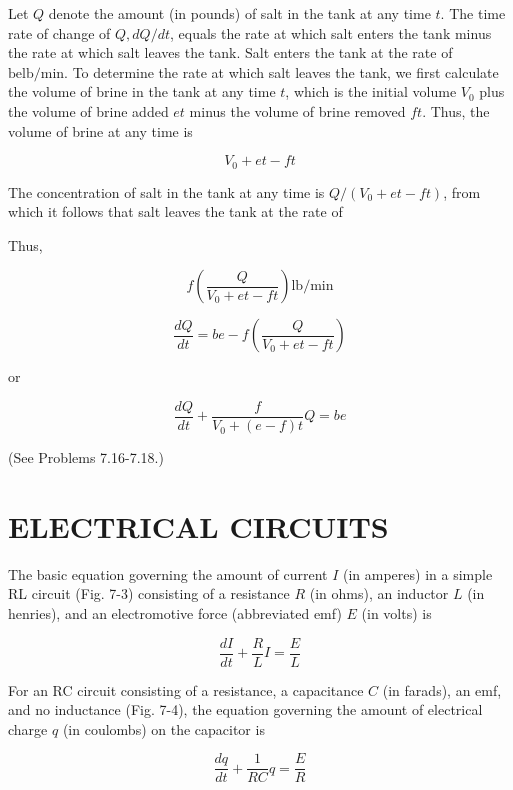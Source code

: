 \documentclass[10pt]{article}
\begin{document}
Let $Q$ denote the amount (in pounds) of salt in the tank at any time $t$. The time rate of change of $Q, d Q / d t$, equals the rate at which salt enters the tank minus the rate at which salt leaves the tank. Salt enters the tank at the rate of $\mathrm{be} \mathrm{lb} / \mathrm{min}$. To determine the rate at which salt leaves the tank, we first calculate the volume of brine in the tank at any time $t$, which is the initial volume $V_{0}$ plus the volume of brine added $e t$ minus the volume of brine removed $f t$. Thus, the volume of brine at any time is


\begin{equation*}
V_{0}+e t-f t \tag{7.7}
\end{equation*}


The concentration of salt in the tank at any time is $Q /\left(V_{0}+e t-f t\right)$, from which it follows that salt leaves the tank at the rate of

Thus,

$$
f\left(\frac{Q}{V_{0}+e t-f t}\right) \mathrm{lb} / \mathrm{min}
$$

$$
\frac{d Q}{d t}=b e-f\left(\frac{Q}{V_{0}+e t-f t}\right)
$$

or


\begin{equation*}
\frac{d Q}{d t}+\frac{f}{V_{0}+(e-f) t} Q=b e \tag{7.8}
\end{equation*}


(See Problems 7.16-7.18.)

\section*{ELECTRICAL CIRCUITS}
The basic equation governing the amount of current $I$ (in amperes) in a simple RL circuit (Fig. 7-3) consisting of a resistance $R$ (in ohms), an inductor $L$ (in henries), and an electromotive force (abbreviated emf) $E$ (in volts) is


\begin{equation*}
\frac{d I}{d t}+\frac{R}{L} I=\frac{E}{L} \tag{7.9}
\end{equation*}


For an RC circuit consisting of a resistance, a capacitance $C$ (in farads), an emf, and no inductance (Fig. 7-4), the equation governing the amount of electrical charge $q$ (in coulombs) on the capacitor is


\begin{equation*}
\frac{d q}{d t}+\frac{1}{R C} q=\frac{E}{R} \tag{7.10}
\end{equation*}
\end{document}
